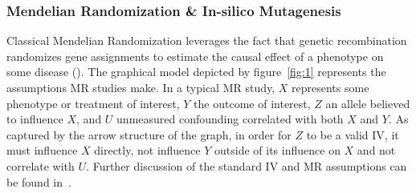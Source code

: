 \subsubsection{Mendelian Randomization \& In-silico Mutagenesis}
Classical Mendelian Randomization leverages the fact that genetic recombination randomizes gene assignments to estimate the causal effect of a phenotype on some disease (\cite{Didelez2007-vs}). The graphical model depicted by figure~\ref{fig:1} represents the assumptions MR studies make. In a typical MR study, \( X \) represents some phenotype or treatment of interest, \( Y \) the outcome of interest, \( Z \) an allele believed to influence \( X \), and \( U \) unmeasured confounding correlated with both \( X \) and \( Y\). As captured by the arrow structure of the graph, in order for \( Z \) to be a valid IV, it must influence \( X \) directly, not influence \( Y \) outside of its influence on \( X \) and not correlate with \( U \). Further discussion of the standard IV and MR assumptions can be found in~\cite{Didelez2007-vs}.

